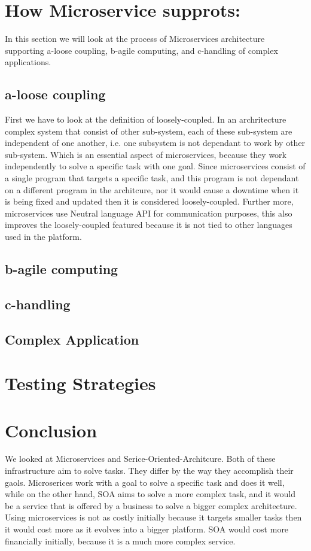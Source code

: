 \documentclass{IEEEtran}
\begin{document}
	\section{How Microservice supprots:}
		In this section we will look at the process of Microservices architecture supporting a-loose coupling, b-agile computing, and c-handling of complex applications.  

		\subsection{a-loose coupling}
			First we have to look at the definition of loosely-coupled. In an archritecture complex system that consist of other sub-system, each of these sub-system are independent of one another, i.e. one subsystem is not dependant to work by other sub-system. Which is an essential aspect of microservices, because they work independently to solve a specific task with one goal. Since microservices consist of a single program that targets a specific task, and this program is not dependant on a different program in the architcure, nor it would cause a downtime when it is being fixed and updated then it is considered loosely-coupled. Further more, microservices use Neutral language API for communication purposes, this also improves the loosely-coupled featured because it is not tied to other languages used in the platform. 
		\subsection{b-agile computing}
		\subsection{c-handling}
		\subsection{Complex Application}
	

	\section{Testing Strategies}
	\section{Conclusion}
		We looked at Microservices and Serice-Oriented-Architcure. Both of these infrastructure aim to solve tasks. They differ by the way they accomplish their gaols. Microserices work with a goal to solve a specific task and does it well, while on the other hand, SOA aims to solve a more complex task, and it would be a service that is offered by a business to solve a bigger complex architecture. Using microservices is not as costly initially because it targets smaller tasks then it would cost more as it evolves into a bigger platform. SOA would cost more financially initially, because it is a much more complex service. 




	\newpage
	
	
\end{document}
